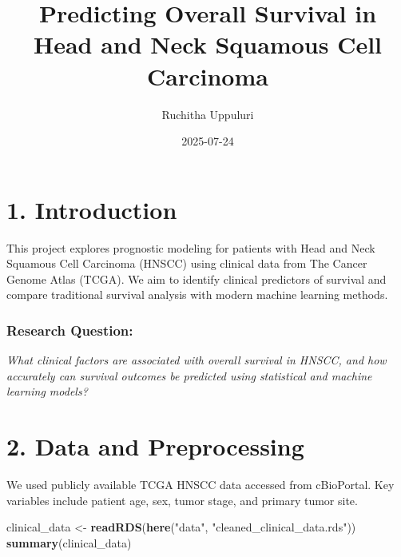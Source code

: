 \documentclass[
  11pt,
]{article}
\title{Predicting Overall Survival in Head and Neck Squamous Cell
Carcinoma}
\author{Ruchitha Uppuluri}
\date{2025-07-24}
\newenvironment{Shaded}{\begin{snugshade}}{\end{snugshade}}
\newcommand{\FunctionTok}[1]{\textcolor[rgb]{0.13,0.29,0.53}{\textbf{#1}}}
\newcommand{\NormalTok}[1]{#1}
\newcommand{\OtherTok}[1]{\textcolor[rgb]{0.56,0.35,0.01}{#1}}
\newcommand{\StringTok}[1]{\textcolor[rgb]{0.31,0.60,0.02}{#1}}
\begin{document}
\maketitle

\section{1. Introduction}\label{introduction}

This project explores prognostic modeling for patients with Head and
Neck Squamous Cell Carcinoma (HNSCC) using clinical data from The Cancer
Genome Atlas (TCGA). We aim to identify clinical predictors of survival
and compare traditional survival analysis with modern machine learning
methods.

\subsubsection{Research Question:}\label{research-question}

\emph{What clinical factors are associated with overall survival in
HNSCC, and how accurately can survival outcomes be predicted using
statistical and machine learning models?}

\section{2. Data and Preprocessing}\label{data-and-preprocessing}

We used publicly available TCGA HNSCC data accessed from cBioPortal. Key
variables include patient age, sex, tumor stage, and primary tumor site.

\begin{Shaded}
\begin{Highlighting}[]
\NormalTok{clinical\_data }\OtherTok{\textless{}{-}} \FunctionTok{readRDS}\NormalTok{(}\FunctionTok{here}\NormalTok{(}\StringTok{"data"}\NormalTok{, }\StringTok{"cleaned\_clinical\_data.rds"}\NormalTok{))}
\FunctionTok{summary}\NormalTok{(clinical\_data)}
\end{Highlighting}
\end{Shaded}
\end{document}
